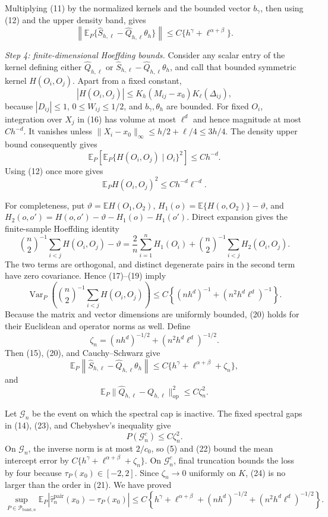 Multiplying (11) by the normalized kernels and the bounded vector
\(b_\gamma\), then using (12) and the upper density band, gives
\[
\left\|
\mathbb E_P\{\widehat S_{h,\ell}
-\widehat Q_{h,\ell}\theta_h\}
\right\|
\leq C\{h^\gamma+\ell^{\alpha+\beta}\}.
\tag{15}
\]

\emph{Step 4: finite-dimensional Hoeffding bounds.}
Consider any scalar entry of the kernel defining either
\(\widehat Q_{h,\ell}\) or
\(\widehat S_{h,\ell}-\widehat Q_{h,\ell}\theta_h\), and call that
bounded symmetric kernel \(H(O_i,O_j)\).  Apart from a fixed constant,
\[
|H(O_i,O_j)|
\leq K_h(M_{ij}-x_0)K_\ell(\Delta_{ij}),
\tag{16}
\]
because \(|D_{ij}|\leq1\), \(0\leq W_{ij}\leq1/2\), and
\(b_\gamma,\theta_h\) are bounded.  For fixed \(O_i\), integration over
\(X_j\) in (16) has volume at most \(\ell^d\) and hence magnitude at most
\(Ch^{-d}\).  It vanishes unless
\(\lVert X_i-x_0\rVert_\infty\leq h/2+\ell/4\leq3h/4\).  The density
upper bound consequently gives
\[
\mathbb E_P\left[
\mathbb E_P\{H(O_i,O_j)\mid O_i\}^2
\right]\leq Ch^{-d}.
\tag{17}
\]
Using (12) once more gives
\[
\mathbb E_P H(O_i,O_j)^2\leq Ch^{-d}\ell^{-d}.
\tag{18}
\]

For completeness, put \(\vartheta=\mathbb EH(O_1,O_2)\),
\(H_1(o)=\mathbb E\{H(o,O_2)\}-\vartheta\), and
\(H_2(o,o')=H(o,o')-\vartheta-H_1(o)-H_1(o')\).  Direct expansion gives
the finite-sample Hoeffding identity
\[
\binom n2^{-1}\sum_{i<j}H(O_i,O_j)-\vartheta
=\frac2n\sum_{i=1}^n H_1(O_i)
+\binom n2^{-1}\sum_{i<j}H_2(O_i,O_j).
\tag{19}
\]
The two terms are orthogonal, and distinct degenerate pairs in the second term
have zero covariance.  Hence (17)--(19) imply
\[
\operatorname{Var}_P\!\left(
\binom n2^{-1}\sum_{i<j}H(O_i,O_j)
\right)
\leq C\left\{(nh^d)^{-1}+(n^2h^d\ell^d)^{-1}\right\}.
\tag{20}
\]
Because the matrix and vector dimensions are uniformly bounded, (20) holds
for their Euclidean and operator norms as well.  Define
\[
\zeta_n=(nh^d)^{-1/2}+(n^2h^d\ell^d)^{-1/2}.
\tag{21}
\]
Then (15), (20), and Cauchy--Schwarz give
\[
\mathbb E_P\left\|
\widehat S_{h,\ell}-\widehat Q_{h,\ell}\theta_h
\right\|
\leq C\{h^\gamma+\ell^{\alpha+\beta}+\zeta_n\},
\tag{22}
\]
and
\[
\mathbb E_P\lVert\widehat Q_{h,\ell}-Q_{h,\ell}\rVert_{\mathrm{op}}^2
\leq C\zeta_n^2.
\tag{23}
\]

Let \(\mathcal G_n\) be the event on which the spectral cap is inactive.
The fixed spectral gaps in (14), (23), and Chebyshev's inequality give
\[
P(\mathcal G_n^c)\leq C\zeta_n^2.
\tag{24}
\]
On \(\mathcal G_n\), the inverse norm is at most \(2/c_0\), so (5) and
(22) bound the mean intercept error by
\(C\{h^\gamma+\ell^{\alpha+\beta}+\zeta_n\}\).  On
\(\mathcal G_n^c\), final truncation bounds the loss by four because
\(\tau_P(x_0)\in[-2,2]\).  Since \(\zeta_n\to0\) uniformly on \(K\),
(24) is no larger than the order in (21).  We have proved
\[
\sup_{P\in\mathcal P_{\mathrm{band},n}}
\mathbb E_P\left|
\widehat\tau_n^{\mathrm{pair}}(x_0)-\tau_P(x_0)
\right|
\leq C\left\{
h^\gamma+\ell^{\alpha+\beta}
+(nh^d)^{-1/2}+(n^2h^d\ell^d)^{-1/2}
\right\}.
\tag{25}
\]

